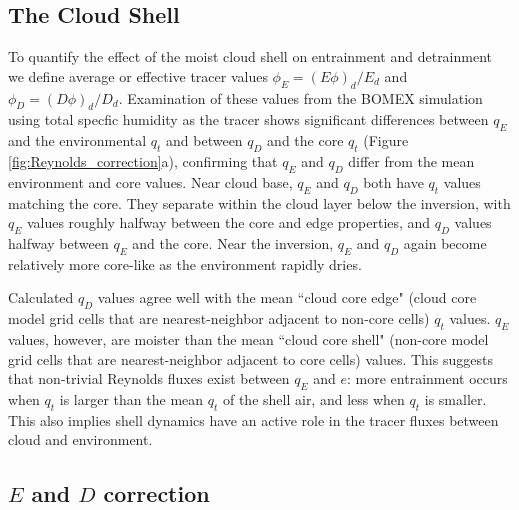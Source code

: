 \documentclass[draft,grl]{agutex}
\begin{document}
\begin{article}

\section{The Cloud Shell}

To quantify the effect of the moist cloud shell on entrainment and detrainment
we define average or effective tracer values $\phi_E = (E\phi)_d / E_d$ and 
$\phi_D = (D\phi)_d / D_d$.
Examination of 
these values from the BOMEX simulation using total specfic humidity as the
tracer shows significant differences between 
$q_E$ and the environmental $q_t$ and between $q_D$ and the core $q_t$ (Figure 
\ref{fig:Reynolds_correction}a), confirming that $q_E$ and $q_D$ differ from
the mean environment and core values.  Near cloud base, $q_E$ and $q_D$ both 
have $q_t$ values matching the core.  They separate within the cloud layer 
below the inversion, with $q_E$ values roughly halfway between the core and 
edge properties, and $q_D$ values halfway between $q_E$ and the core.  Near the 
inversion, $q_E$ and $q_D$ again become relatively more core-like as the 
environment rapidly dries.

Calculated $q_D$ values agree well with the mean ``cloud core edge" (cloud 
core model grid cells that are nearest-neighbor adjacent to non-core cells) 
$q_t$ values.  $q_E$ values, however, are moister than the mean ``cloud 
core shell" (non-core model grid cells that are nearest-neighbor adjacent to 
core cells) values.  This suggests that non-trivial Reynolds fluxes exist 
between $q_E$ and $e$: more entrainment occurs when $q_t$ is larger than the 
mean $q_t$ of the shell air, and less when $q_t$ is smaller.  This also implies 
shell dynamics have an active role in the tracer fluxes between cloud and 
environment.


\subsection{$E$ and $D$ correction}
  

\end{article}
\end{document}
